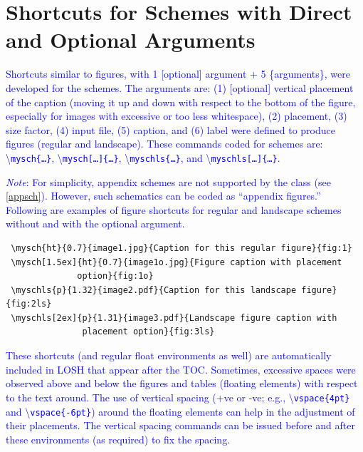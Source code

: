 \documentclass[phd]{ndsu-thesis-2022}
\newcommand\italk[1]{\textcolor{blue}{#1}}  %
\newcommand\cmd[1]{\textbackslash\texttt{#1}}  %
\begin{document}
\section{Shortcuts for Schemes with Direct and Optional Arguments}

\italk{Shortcuts similar to figures, with 1 [optional] argument + 5 \{arguments\}, were developed for the schemes. The arguments are: (1) [optional] vertical placement of the caption (moving it up and down with respect to the bottom of the figure, especially for images with excessive or too less whitespace), (2) placement, (3) size factor, (4) input file, (5) caption, and (6) label were defined to produce figures (regular and landscape). These commands coded for schemes are: \cmd{mysch\{\ldots\}}, \cmd{mysch[\ldots]\{\ldots\}}, \cmd{myschls\{\ldots\}}, and \cmd{myschls[\ldots]\{\ldots\}}.}

\italk{\emph{Note}: For simplicity, appendix schemes are not supported by the class (see \cref{appsch}). However, such schematics can be coded as ``appendix figures.''  Following are examples of figure shortcuts for regular and landscape schemes without and with the optional argument.}

\begin{flushleft}
\hspace{-0.2cm}
\begin{minipage}{0ex}
\begin{verbatim}
 \mysch{ht}{0.7}{image1.jpg}{Caption for this regular figure}{fig:1}
 \mysch[1.5ex]{ht}{0.7}{image1o.jpg}{Figure caption with placement 
              option}{fig:1o}
 \myschls{p}{1.32}{image2.pdf}{Caption for this landscape figure}{fig:2ls}
 \myschls[2ex]{p}{1.31}{image3.pdf}{Landscape figure caption with 
               placement option}{fig:3ls}
\end{verbatim}
\end{minipage}
\end{flushleft}

\italk{These shortcuts (and regular float environments as well) are automatically included in LOSH that appear after the TOC. Sometimes, excessive spaces were observed above and below the figures and tables (floating elements) with respect to the text around. The use of vertical spacing (+ve or -ve; e.g., \cmd{vspace\{4pt\}} and \cmd{vspace\{-6pt\}}) around the floating elements can help in the adjustment of their placements. The vertical spacing commands can be issued before and after these environments (as required) to fix the spacing. }
\end{document}
